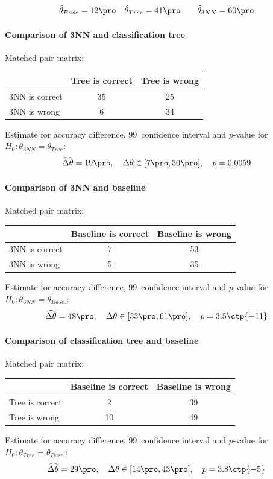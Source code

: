 \documentclass[11pt,fleqn]{article}
\begin{document}
\begin{align*}
	& \hat \theta_{Base}= 12\pro 
	&& \hat \theta_{Tree} =41\pro 
	&&&\hat \theta_{3NN} = 60 \pro 
\end{align*}
\paragraph{Comparison of 3NN and classification tree}
Matched pair matrix:

\begin{table}[H]
	\centering
	\begin{tabular}{l|c c}
		&Tree is correct& Tree is wrong \\
		\hline
		3NN is correct &35& 25\\
		3NN is wrong& 6& 34
	\end{tabular}
\end{table}\noindent 
Estimate for accuracy difference, 99\pro\ confidence interval and \(p\)-value for \(H_0: \theta_{3NN}=\theta_{Tree}\):
\[
\widehat{\Delta \theta} = 19\pro,\quad  \Delta \theta\in[7\pro , 30\pro], \quad p = 0.0059 
\]

\paragraph{Comparison of 3NN and baseline}
Matched pair matrix:

\begin{table}[H]
	\centering
	\begin{tabular}{l|c c}
		&Baseline is correct& Baseline is wrong \\
		\hline
		3NN is correct &7& 53\\
		3NN is wrong& 5& 35
	\end{tabular}
\end{table}\noindent 
Estimate for accuracy difference, 99\pro\ confidence interval and \(p\)-value for \(H_0: \theta_{3NN}=\theta_{Base.}\):
\[
\widehat{\Delta \theta} = 48\pro,\quad  \Delta \theta\in[33\pro , 61\pro], \quad p = 3.5\ctp{-11}
\]

\paragraph{Comparison of classification tree and baseline}
Matched pair matrix:

\begin{table}[H]
	\centering
	\begin{tabular}{l|c c}
		&Baseline is correct& Baseline is wrong \\
		\hline
		Tree is correct &2& 39\\
		Tree is wrong& 10& 49
	\end{tabular}
\end{table}\noindent 
Estimate for accuracy difference, 99\pro\ confidence interval and \(p\)-value for \(H_0: \theta_{Tree}=\theta_{Base.}\):
\[
\widehat{\Delta \theta} = 29\pro,\quad  \Delta \theta\in[14\pro , 43\pro], \quad p = 3.8\ctp{-5}
\]
\end{document}

